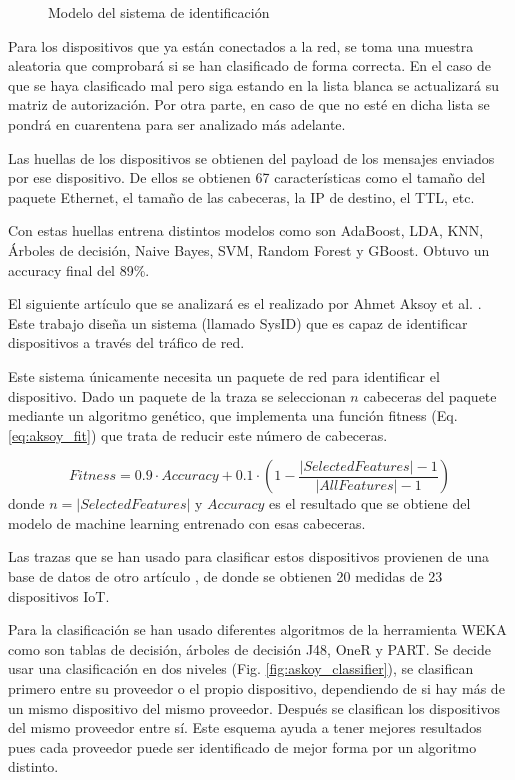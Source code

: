 \begin{figure}[htpb!]
    \centering
    \resizebox{0.6\textwidth}{!}{
        
    }
    \caption{Modelo del sistema de identificación \cite{hamad2019iot}}
    \label{fig:diam_hamad}
\end{figure}

Para los dispositivos que ya están conectados a la red, se toma una muestra aleatoria que comprobará si se han clasificado de forma correcta. En el caso de que se haya clasificado mal pero siga estando en la lista blanca se actualizará su matriz de autorización. Por otra parte, en caso de que no esté en dicha lista se pondrá en cuarentena para ser analizado más adelante.

Las huellas de los dispositivos se obtienen del payload de los mensajes enviados por ese dispositivo. De ellos se obtienen 67 características como el tamaño del paquete Ethernet, el tamaño de las cabeceras, la IP de destino, el TTL, etc.

Con estas huellas entrena distintos modelos como son AdaBoost, LDA, KNN, Árboles de decisión, Naive Bayes, SVM, Random Forest y GBoost. Obtuvo un accuracy final del 89\%.

El siguiente artículo que se analizará es el realizado por Ahmet Aksoy et al. \cite{aksoy2019automated}. Este trabajo diseña un sistema (llamado SysID) que es capaz de identificar dispositivos a través del tráfico de red. 

Este sistema únicamente necesita un paquete de red para identificar el dispositivo. Dado un paquete de la traza se seleccionan $n$ cabeceras del paquete mediante un algoritmo genético, que implementa una función fitness (Eq. \ref{eq:aksoy_fit}) que trata de reducir este número de cabeceras. 

\begin{equation}
    Fitness = 0.9 \cdot Accuracy + 0.1 \cdot \left( 1 - \frac{\lvert SelectedFeatures \rvert - 1}{\lvert AllFeatures \rvert - 1} \right)
    \label{eq:aksoy_fit}
\end{equation}
donde $n = \lvert SelectedFeatures \rvert$ y $Accuracy$ es el resultado que se obtiene del modelo de machine learning entrenado con esas cabeceras.

Las trazas que se han usado para clasificar estos dispositivos provienen de una base de datos de otro artículo \cite{miettinen2017iot}, de donde se obtienen 20 medidas de 23 dispositivos IoT.

Para la clasificación se han usado diferentes algoritmos de la herramienta WEKA \cite{hall2009weka} como son tablas de decisión, árboles de decisión J48, OneR y PART. Se decide usar una clasificación en dos niveles (Fig. \ref{fig:askoy_classifier}), se clasifican primero entre su proveedor o el propio dispositivo, dependiendo de si hay más de un mismo dispositivo del mismo proveedor. Después se clasifican los dispositivos del mismo proveedor entre sí. Este esquema ayuda a tener mejores resultados pues cada proveedor puede ser identificado de mejor forma por un algoritmo distinto.

